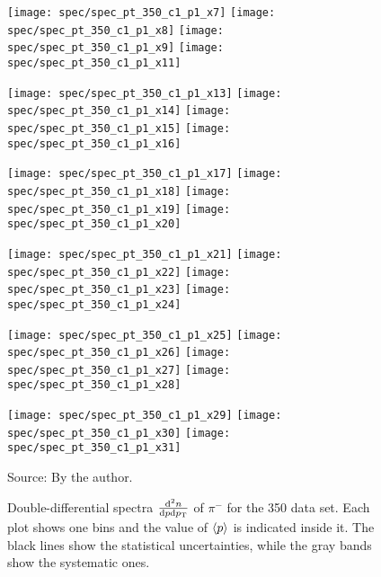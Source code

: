 \begin{figure}[!ht]
  \centering

  \texttt{[image: spec/spec\_pt\_350\_c1\_p1\_x7]}
  \texttt{[image: spec/spec\_pt\_350\_c1\_p1\_x8]}
  \texttt{[image: spec/spec\_pt\_350\_c1\_p1\_x9]}
  \texttt{[image: spec/spec\_pt\_350\_c1\_p1\_x11]}

  \texttt{[image: spec/spec\_pt\_350\_c1\_p1\_x13]}
  \texttt{[image: spec/spec\_pt\_350\_c1\_p1\_x14]}
  \texttt{[image: spec/spec\_pt\_350\_c1\_p1\_x15]}
  \texttt{[image: spec/spec\_pt\_350\_c1\_p1\_x16]}

  \texttt{[image: spec/spec\_pt\_350\_c1\_p1\_x17]}
  \texttt{[image: spec/spec\_pt\_350\_c1\_p1\_x18]}
  \texttt{[image: spec/spec\_pt\_350\_c1\_p1\_x19]}
  \texttt{[image: spec/spec\_pt\_350\_c1\_p1\_x20]}

  \texttt{[image: spec/spec\_pt\_350\_c1\_p1\_x21]}
  \texttt{[image: spec/spec\_pt\_350\_c1\_p1\_x22]}
  \texttt{[image: spec/spec\_pt\_350\_c1\_p1\_x23]}
  \texttt{[image: spec/spec\_pt\_350\_c1\_p1\_x24]}

  \texttt{[image: spec/spec\_pt\_350\_c1\_p1\_x25]}
  \texttt{[image: spec/spec\_pt\_350\_c1\_p1\_x26]}
  \texttt{[image: spec/spec\_pt\_350\_c1\_p1\_x27]}
  \texttt{[image: spec/spec\_pt\_350\_c1\_p1\_x28]}

  \texttt{[image: spec/spec\_pt\_350\_c1\_p1\_x29]}
  \texttt{[image: spec/spec\_pt\_350\_c1\_p1\_x30]}
  \texttt{[image: spec/spec\_pt\_350\_c1\_p1\_x31]}

  \caption{Double-differential spectra $\frac{\text{d}^2n}{\text{d}p\text{d}p_\text{T}}$
    of $\pi^-$ for the 350 \GeVc data set. Each plot shows one \pp bins and the value
    of $\langle p\rangle$ is indicated inside it. The black lines show the statistical
    uncertainties, while the gray bands show the systematic ones.}
  \label{fig:hadron:spec:dedx:all350:c1p1}
  \begin{center}
    \small Source: By the author. 
  \end{center}
\end{figure}


